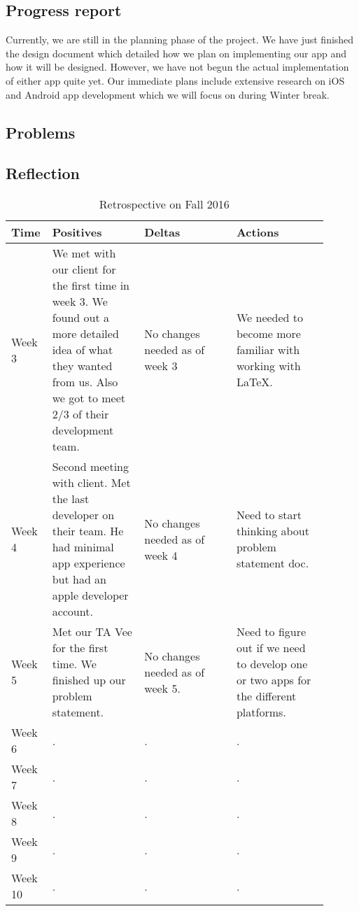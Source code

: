 \documentclass[letterpaper,10pt,draftclsnofoot,onecolumn,titlepage]{IEEEtran}
\begin{document}
		\subsection{Progress report}
		Currently, we are still in the planning phase of the project. 
		We have just finished the design document which detailed how we plan on implementing our app and how it will be designed. 
		However, we have not begun the actual implementation of either app quite yet. 
		Our immediate plans include extensive research on iOS and Android app development which we will focus on during Winter break. 
		

		\subsection{Problems}



		\subsection{Reflection}
			\begin{table}[H]
			\caption{Retrospective on Fall 2016}
			\begin{center}
				\begin{tabular}{| p{0.06\linewidth} | p{0.28\linewidth} | p{0.28\linewidth} | p{0.28\linewidth} | }
					\hline
					\textbf{Time} & \textbf{Positives} & \textbf{Deltas} & \textbf{Actions} \\ [0.5ex]
					\hline
					Week 3 & We met with our client for the first time in week 3. We found out a more detailed idea of what they wanted from us. Also we got to meet 2/3 of their development team.  & No changes needed as of week 3 & We needed to become more familiar with working with LaTeX. \\
					\hline
					Week 4 & Second meeting with client. Met the last developer on their team. He had minimal app experience but had an apple developer account. & No changes needed as of week 4 & Need to start thinking about problem statement doc. \\
					\hline
					Week 5 & Met our TA Vee for the first time. We finished up our problem statement. & No changes needed as of week 5. & Need to figure out if we need to develop one or two apps for the different platforms. \\
					\hline
					Week 6 & . & . & . \\
					\hline
					Week 7 & . & . & . \\
					\hline
					Week 8 & . & . & . \\
					\hline
					Week 9 & . & . & . \\
					\hline
					Week 10 & . & . & . \\
					\hline

				\end{tabular}
			\end{center}
			\end{table}
\end{document}
